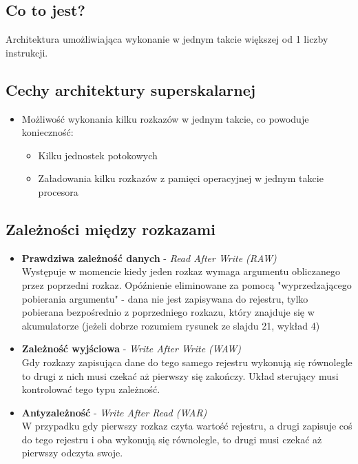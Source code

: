 	\subsection{Co to jest?}
		Architektura umożliwiająca wykonanie w jednym takcie większej od 1 liczby instrukcji.
	   	\subsection*{Cechy architektury superskalarnej}
	       	\begin{itemize}
	        	\item Możliwość wykonania kilku rozkazów w jednym takcie, co powoduje konieczność:
			    \begin{itemize}
		          	\item Kilku jednostek potokowych
		         	\item Załadowania kilku rozkazów z pamięci operacyjnej w jednym takcie procesora
			    \end{itemize}
	        \end{itemize}
	
    \subsection{Zależności między rozkazami}
       	\begin{itemize}
         \item \textbf{Prawdziwa zależność danych} - \emph{Read After Write (RAW)}\\
         Występuje w momencie kiedy jeden rozkaz wymaga argumentu obliczanego przez poprzedni rozkaz. Opóźnienie eliminowane za pomocą "wyprzedzającego pobierania argumentu" - dana nie jest zapisywana do rejestru, tylko pobierana bezpośrednio z poprzedniego rozkazu, który znajduje się w akumulatorze (jeżeli dobrze rozumiem rysunek ze slajdu 21, wykład 4)
         \item \textbf{Zależność wyjściowa} - \emph{Write After Write (WAW)}\\
         Gdy rozkazy zapisująca dane do tego samego rejestru wykonują się równolegle to drugi z nich musi czekać aż pierwszy się zakończy. Układ sterujący musi kontrolować tego typu zależność.
         \item \textbf{Antyzależność} - \emph{Write After Read (WAR)}\\
         W przypadku gdy pierwszy rozkaz czyta wartość rejestru, a drugi zapisuje coś do tego rejestru i oba wykonują się równolegle, to drugi musi czekać aż pierwszy odczyta swoje.
        \end{itemize}
